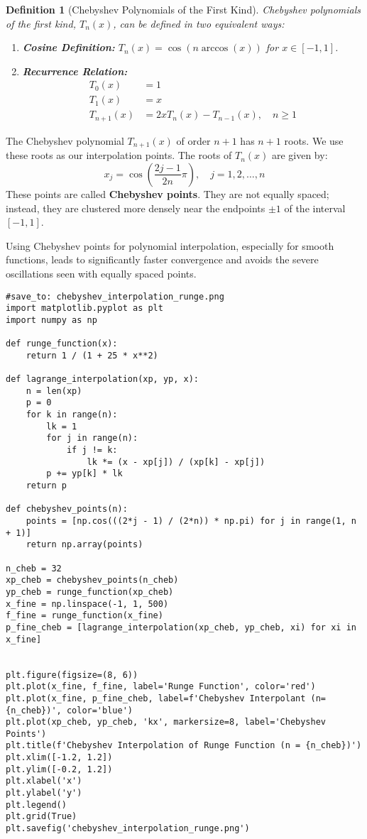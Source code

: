 \documentclass{article}
\newtheorem{definition}{Definition}
\begin{document}
\begin{definition}[Chebyshev Polynomials of the First Kind]
Chebyshev polynomials of the first kind, $T_n(x)$, can be defined in two equivalent ways:
\begin{enumerate}
    \item \textbf{Cosine Definition:} $T_n(x) = \cos(n \arccos(x))$ for $x \in [-1, 1]$.
    \item \textbf{Recurrence Relation:}
    \begin{align*}
        T_0(x) &= 1 \\
        T_1(x) &= x \\
        T_{n+1}(x) &= 2x T_n(x) - T_{n-1}(x), \quad n \geq 1
    \end{align*}
\end{enumerate}
\end{definition}

The Chebyshev polynomial $T_{n+1}(x)$ of order $n+1$ has $n+1$ roots. We use these roots as our interpolation points. The roots of $T_n(x)$ are given by:
\[
x_j = \cos\left(\frac{2j - 1}{2n} \pi\right), \quad j = 1, 2, \dots, n
\]
These points are called \textbf{Chebyshev points}. They are not equally spaced; instead, they are clustered more densely near the endpoints $\pm 1$ of the interval $[-1, 1]$.

Using Chebyshev points for polynomial interpolation, especially for smooth functions, leads to significantly faster convergence and avoids the severe oscillations seen with equally spaced points.

\begin{verbatim}
#save_to: chebyshev_interpolation_runge.png
import matplotlib.pyplot as plt
import numpy as np

def runge_function(x):
    return 1 / (1 + 25 * x**2)

def lagrange_interpolation(xp, yp, x):
    n = len(xp)
    p = 0
    for k in range(n):
        lk = 1
        for j in range(n):
            if j != k:
                lk *= (x - xp[j]) / (xp[k] - xp[j])
        p += yp[k] * lk
    return p

def chebyshev_points(n):
    points = [np.cos(((2*j - 1) / (2*n)) * np.pi) for j in range(1, n + 1)]
    return np.array(points)

n_cheb = 32
xp_cheb = chebyshev_points(n_cheb)
yp_cheb = runge_function(xp_cheb)
x_fine = np.linspace(-1, 1, 500)
f_fine = runge_function(x_fine)
p_fine_cheb = [lagrange_interpolation(xp_cheb, yp_cheb, xi) for xi in x_fine]


plt.figure(figsize=(8, 6))
plt.plot(x_fine, f_fine, label='Runge Function', color='red')
plt.plot(x_fine, p_fine_cheb, label=f'Chebyshev Interpolant (n={n_cheb})', color='blue')
plt.plot(xp_cheb, yp_cheb, 'kx', markersize=8, label='Chebyshev Points')
plt.title(f'Chebyshev Interpolation of Runge Function (n = {n_cheb})')
plt.xlim([-1.2, 1.2])
plt.ylim([-0.2, 1.2])
plt.xlabel('x')
plt.ylabel('y')
plt.legend()
plt.grid(True)
plt.savefig('chebyshev_interpolation_runge.png')

\end{verbatim}
\end{document}
